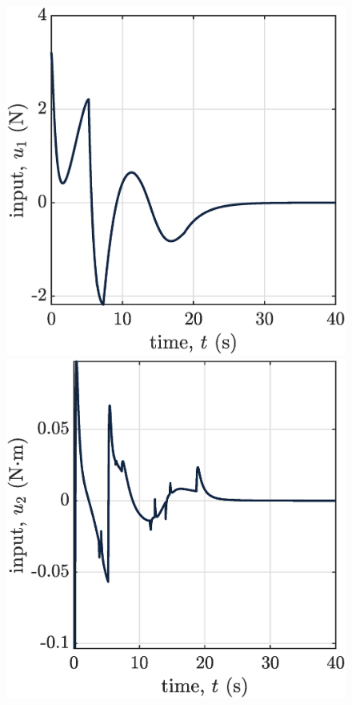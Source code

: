 \begin{figure}[!ht]
    \begin{minipage}[t]{.45\textwidth}
        \centering
        \includegraphics[width=\textwidth]{figures/sim4u1.eps}
    \end{minipage}
    \hfill
    \begin{minipage}[t]{.45\textwidth}
        \centering
        \includegraphics[width=\textwidth]{figures/sim4u2.eps}

\end{minipage}
\end{figure}
